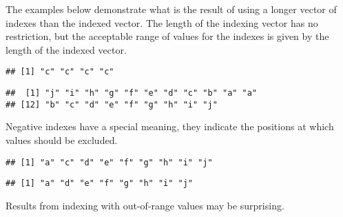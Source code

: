 \documentclass[paper=a4,10pt,div=17,headsepline,BCOR=12mm,twoside,open=right]{scrbook}\usepackage{knitr}
\begin{document}
The examples below demonstrate what is the result of using a longer vector of indexes than the indexed vector. The length of the indexing vector has no restriction, but the acceptable range of values for the indexes is given by the length of the indexed vector.

\begin{knitrout}\footnotesize
{}\color{fgcolor}\begin{kframe}
\begin{alltt}
\hlstd{a[}\hlstd{(}\hlstd{,}\hlstd{,}\hlstd{,}\hlstd{)]}
\end{alltt}
\begin{verbatim}
## [1] "c" "c" "c" "c"
\end{verbatim}
\begin{alltt}
\hlstd{a[}\hlstd{(}\hlopt{:}\hlstd{,} \hlopt{:}\hlstd{)]}
\end{alltt}
\begin{verbatim}
##  [1] "j" "i" "h" "g" "f" "e" "d" "c" "b" "a" "a"
## [12] "b" "c" "d" "e" "f" "g" "h" "i" "j"
\end{verbatim}
\end{kframe}
\end{knitrout}

Negative indexes have a special meaning, they indicate the positions at which values should be excluded.

\begin{knitrout}\footnotesize
{}\color{fgcolor}\begin{kframe}
\begin{alltt}
\hlstd{a[}\hlopt{-}\hlstd{]}
\end{alltt}
\begin{verbatim}
## [1] "a" "c" "d" "e" "f" "g" "h" "i" "j"
\end{verbatim}
\begin{alltt}
\hlstd{a[}\hlopt{-}\hlstd{(}\hlstd{,}\hlstd{)]}
\end{alltt}
\begin{verbatim}
## [1] "a" "d" "e" "f" "g" "h" "i" "j"
\end{verbatim}
\end{kframe}
\end{knitrout}

Results from indexing with out-of-range values may be surprising.
\end{document}
